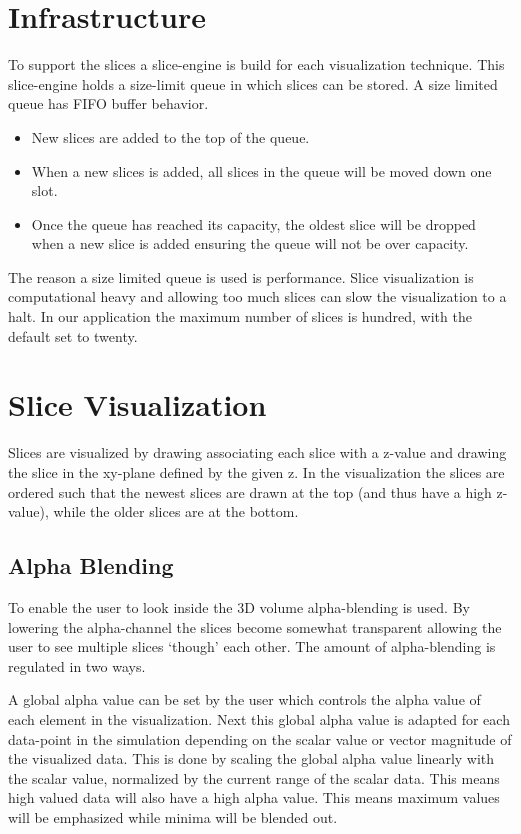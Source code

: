 \section{Infrastructure} %
\label{sec:infrastructure}
To support the slices a slice-engine is build for each visualization technique. This slice-engine holds a size-limit queue in which slices can be stored. A size limited queue has FIFO buffer behavior.
\begin{itemize}
 	\item New slices are added to the top of the queue.
 	\item When a new slices is added, all slices in the queue will be moved down one slot. 
 	\item Once the queue has reached its capacity, the oldest slice will be dropped when a new slice is added ensuring the queue will not be over capacity.
 \end{itemize}
 The reason a size limited queue is used is performance. Slice visualization is computational heavy and allowing too much slices can slow the visualization to a halt. In our application the maximum number of slices is hundred, with the default set to twenty.

\section{Slice Visualization} %
\label{sec:slice_visualization}
Slices are visualized by drawing associating each slice with a z-value and drawing the slice in the xy-plane defined by the given z. In the visualization the slices are ordered such that the newest slices are drawn at the top (and thus have a high z-value), while the older slices are at the bottom. 


\subsection{Alpha Blending} %
\label{sub:alpha_blending}
To enable the user to look inside the 3D volume alpha-blending is used. By lowering the alpha-channel the slices become somewhat transparent allowing the user to see multiple slices `though' each other. The amount of alpha-blending is regulated in two ways. 

A global alpha value can be set by the user which controls the alpha value of each element in the visualization. Next this global alpha value is adapted for each data-point in the simulation depending on the scalar value or vector magnitude of the visualized data. This is done by scaling the global alpha value linearly with the scalar value, normalized by the current range of the scalar data. This means high valued data will also have a high alpha value. This means maximum values will be emphasized while minima will be blended out.

